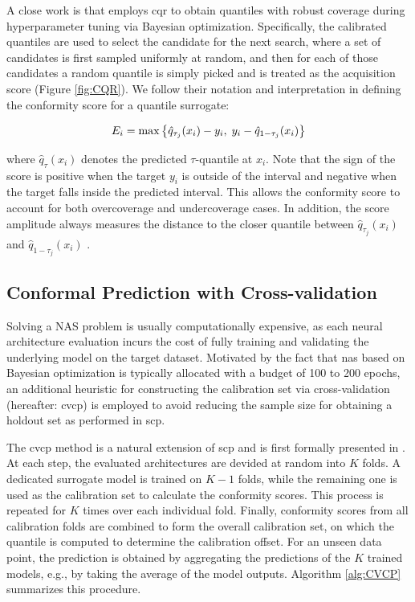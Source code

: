 {\begin{description}[leftmargin=0cm, listparindent=\parindent]
	 A close work is \cite{salinas2023optimizing} that employs \gls{cqr} to obtain quantiles with robust coverage during hyperparameter tuning via Bayesian optimization. Specifically, the calibrated quantiles are used to select the candidate for the next search, where a set of candidates is first sampled uniformly at random, and then for each of those candidates a random quantile is simply picked and is treated as the acquisition score (Figure \ref{fig:CQR}). We follow their notation and interpretation in defining the conformity score for a quantile surrogate:  
	 
	 \begin{equation}
		E_i = \max \big\{\hat{q}_{\tau_j}(x_i) - y_i, \; y_i - \hat{q}_{1-\tau_j}(x_i) \big\}
	 \vspace{0.7em}
	 \label{scoreCQR}
	 \end{equation}
	 
	 \noindent where $\hat{q}_{\tau}(x_i)$ denotes the predicted $\tau$-quantile at $x_i$. Note that the sign of the score is positive when the target $y_i$ is outside of the interval and negative when the target falls inside the predicted interval. This allows the conformity score to account for both overcoverage and undercoverage cases. In addition, the score amplitude always measures the distance to the closer quantile between $\hat{q}_{\tau_j}(x_i)$ and $\hat{q}_{1-\tau_j}(x_i)$ \cite{romano2019conformalized, salinas2023optimizing}.	 

\end{description}


\subsection{Conformal Prediction with Cross-validation}}
Solving a NAS problem is usually computationally expensive, as each neural architecture evaluation incurs the cost of fully training and validating the underlying model on the target dataset. Motivated by the fact that \gls{nas} based on Bayesian optimization is typically allocated with a budget of 100 to 200 epochs, an additional heuristic for constructing the calibration set via cross-validation (hereafter: \gls{cvcp}) is employed to avoid reducing the sample size for obtaining a holdout set as performed in \gls{scp}.

The \gls{cvcp} method is a natural extension of \gls{scp} and is first formally presented in  \cite{vovk2015cross}. At each step, the evaluated architectures are devided at random into $K$ folds. A dedicated surrogate model is trained on $K-1$ folds, while the remaining one is used as the calibration set to calculate the conformity scores. This process is repeated for $K$ times over each individual fold. Finally, conformity scores from all calibration folds are combined to form the overall calibration set, on which the quantile is computed to determine the calibration offset. For an unseen data point, the prediction is obtained by aggregating the predictions of the $K$ trained models, e.g., by taking the average of the model outputs.  Algorithm \ref{alg:CVCP} summarizes this procedure. 

